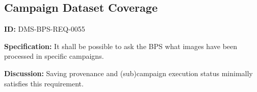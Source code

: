 \documentclass[SE,toc]{lsstdoc}
\newcommand{\addendum}{}
\begin{document}
\subsection{Campaign Dataset Coverage}

\label{DMS-BPS-REQ-0055}
\textbf{ID:} DMS-BPS-REQ-0055

\textbf{Specification:}
It shall be possible to ask the BPS what images have been processed in specific campaigns.

\textbf{Discussion:}
Saving provenance and (sub)campaign execution status minimally satisfies this requirement.

\addendum


\end{document}

